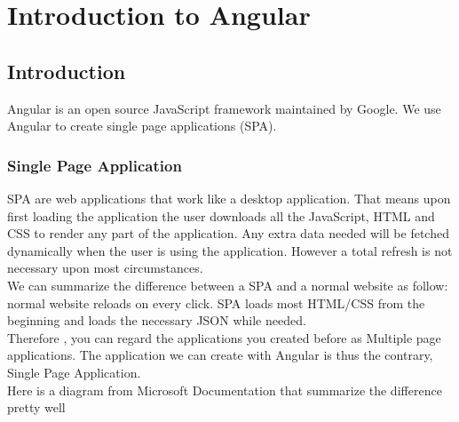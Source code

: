 \documentclass[a4paper]{article}
\begin{document}
\maketitle


\tableofcontents

\section{Introduction to Angular}
\subsection{Introduction}
Angular is an open source JavaScript framework maintained by Google. We use Angular to create single page applications (SPA).
\subsubsection{Single Page Application}

SPA are web applications that work like a desktop application. That means upon first loading the application the user downloads all the JavaScript, HTML and CSS to render any part of the application. Any extra data needed will be fetched dynamically when the user is using the application. However a total refresh is not necessary upon most circumstances.\\

We can summarize the difference between a SPA and a normal website as follow: normal website reloads on every click. SPA loads most HTML/CSS from the beginning and loads the necessary JSON while needed.\\

Therefore , you can regard the applications you created before as Multiple page applications. The application we can create with Angular is thus the contrary, Single Page Application.\\

Here is a diagram from Microsoft Documentation that summarize the difference pretty well
\end{document}
